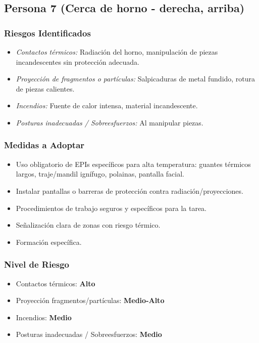 \documentclass[12pt,a4paper]{article}
\begin{document}
	\bigskip\hrulefill\bigskip
	
	\subsection{Persona 7 (Cerca de horno - derecha, arriba)}
	
	\subsubsection{Riesgos Identificados}
	\begin{itemize}
		\item \textit{Contactos térmicos:} Radiación del horno, manipulación de piezas incandescentes sin protección adecuada.
		\item \textit{Proyección de fragmentos o partículas:} Salpicaduras de metal fundido, rotura de piezas calientes.
		\item \textit{Incendios:} Fuente de calor intensa, material incandescente.
		\item \textit{Posturas inadecuadas / Sobreesfuerzos:} Al manipular piezas.
	\end{itemize}
	
	\subsubsection{Medidas a Adoptar}
	\begin{itemize}
		\item Uso obligatorio de EPIs específicos para alta temperatura: guantes térmicos largos, traje/mandil ignífugo, polainas, pantalla facial.
		\item Instalar pantallas o barreras de protección contra radiación/proyecciones.
		\item Procedimientos de trabajo seguros y específicos para la tarea.
		\item Señalización clara de zonas con riesgo térmico.
		\item Formación específica.
	\end{itemize}
	
	\subsubsection{Nivel de Riesgo}
	\begin{itemize}
		\item Contactos térmicos: \textbf{Alto}
		\item Proyección fragmentos/partículas: \textbf{Medio-Alto}
		\item Incendios: \textbf{Medio}
		\item Posturas inadecuadas / Sobreesfuerzos: \textbf{Medio}
	\end{itemize}
	
\end{document}
